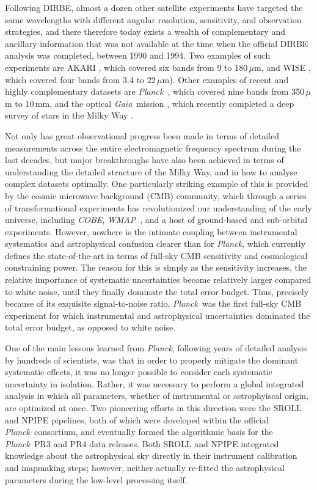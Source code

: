 \documentclass{aa}
\def\Planck{\textit{Planck}}
\def\WMAP{\textit{WMAP}}
\def\COBE{\textit{COBE}}
\def\GAIA{\textit{Gaia}}
\begin{document}
Following DIRBE, almost a dozen other satellite experiments have targeted the same wavelengths with different angular resolution, sensitivity, and observation strategies, and there therefore today exists a wealth of complementary and ancillary information that was not available at the time when the official DIRBE analysis was completed, between 1990 and 1994. Two examples of such experiments are AKARI \citep{murakami:2007}, which covered six bands from 9 to 180\,$\mu$m, and WISE \citep{wright:2010}, which covered four bands from 3.4 to 22\,$\mu$m). Other examples of recent and highly complementary datasets are \Planck\ \citep{planck2016-l01}, which covered nine bands from 350\,$\mu$m to 10\,mm, and the optical \GAIA\ mission \citep{gaia:2016}, which recently completed a deep survey of stars in the Milky Way \citep{gaia:2018}.

Not only has great observational progress been made in terms of detailed measurements across the entire electromagnetic frequency spectrum during the last decades, but major breakthroughs have also been achieved in terms of understanding the detailed structure of the Milky Way, and in how to analyse complex datasets optimally. One particularly striking example of this is provided by the cosmic microwave background (CMB) community, which through a series of transformational experiments has revolutionized our understanding of the early universe, including \COBE, \WMAP\ \citep{bennett2012}, and a host of ground-based and sub-orbital experiments. However, nowhere is the intimate coupling between instrumental systematics and astrophysical confusion clearer than for  \Planck, which currently defines the state-of-the-art in terms of full-sky CMB sensitivity and cosmological constraining power. The reason for this is simply as the sensitivity increases, the relative importance of systematic uncertainties become relatively larger compared to white noise, until they finally dominate the total error budget. Thus, precisely because of its exquisite signal-to-noise ratio, \Planck\ was the first full-sky CMB experiment for which instrumental and astrophysical uncertainties dominated the total error budget, as opposed to white noise.


One of the main lessons learned from \Planck, following years of detailed analysis by hundreds of scientists, was that in order to properly mitigate the dominant systematic effects, it was no longer possible to consider each systematic uncertainty in isolation. Rather, it was necessary to perform a global integrated analysis in which all parameters, whether of instrumental or astrophyiscal origin, are optimized at once. Two pioneering efforts in this direction were the SROLL\ \citep{sroll2} and NPIPE \citep{npipe} pipelines, both of which were developed within the official \Planck\ consortium, and eventually formed the algorithmic basis for the \Planck\ PR3 and PR4 data releases. Both SROLL and NPIPE integrated knowledge about the astrophysical sky directly in their instrument calibration and mapmaking steps; however, neither actually re-fitted the astrophysical parameters during the low-level processing itself.
\end{document}
